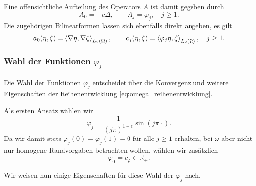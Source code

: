 Eine offensichtliche Aufteilung des Operators $A$ ist damit gegeben durch
\begin{equation}
    A_{0} = - c \Delta, \qquad
    A_{j} = \varphi_{j}, \quad j \geq 1.
\end{equation}
Die zugehörigen Bilinearformen lassen sich ebenfalls direkt angeben, es gilt
\begin{equation}
    a_{0}(\eta, \zeta) = \left\langle\nabla \eta,\nabla \zeta\right\rangle_{L_{2}(\Omega)}, \qquad a_{j}(\eta, \zeta) = \left\langle\varphi_{j} \eta,\zeta\right\rangle_{L_{2}(\Omega)}, \quad j \geq 1.
\end{equation}


\subsubsection{Wahl der Funktionen $\varphi_{j}$} %
\label{ssub:wahl_der_funktionen_}

Die Wahl der Funktionen $\varphi_{j}$ entscheidet über die Konvergenz und weitere Eigenschaften der Reihenentwicklung \eqref{eq:omega_reihenentwicklung}.

Als ersten Ansatz wählen wir
\begin{equation}
    \varphi_{j} = \frac{1}{(j \pi)^{1 + \epsilon}} \sin(j \pi \cdot).
\end{equation}
Da wir damit stets $\varphi_{j}(0) = \varphi_{j}(1) = 0$ für alle $j \geq 1$ erhalten, bei $\omega$ aber nicht nur homogene Randvorgaben betrachten wollen, wählen wir zusätzlich
\begin{equation}
    \label{eq:entwicklung_phi_0_konstante}
    \varphi_{0} = c_{\varphi} \in \mathbb{R}_{+}.
\end{equation}

Wir weisen nun einige Eigenschaften für diese Wahl der $\varphi_{j}$ nach.

